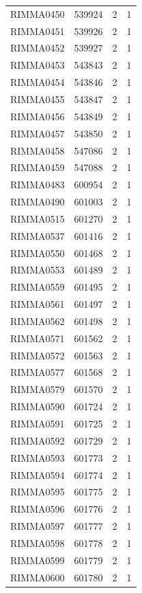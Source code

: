 \documentclass[11pt]{article}
\newcounter{rowno}
\begin{document}
\begin{scriptsize}
\begin{longtable}{>{\stepcounter{rowno}}cccc}
    RIMMA0450 & 539924 & 2     & 1 \\
    RIMMA0451 & 539926 & 2     & 1 \\
    RIMMA0452 & 539927 & 2     & 1 \\
    RIMMA0453 & 543843 & 2     & 1 \\
    RIMMA0454 & 543846 & 2     & 1 \\
    RIMMA0455 & 543847 & 2     & 1 \\
    RIMMA0456 & 543849 & 2     & 1 \\
    RIMMA0457 & 543850 & 2     & 1 \\
    RIMMA0458 & 547086 & 2     & 1 \\
    RIMMA0459 & 547088 & 2     & 1 \\
    RIMMA0483 & 600954 & 2     & 1 \\
    RIMMA0490 & 601003 & 2     & 1 \\
    RIMMA0515 & 601270 & 2     & 1 \\
    RIMMA0537 & 601416 & 2     & 1 \\
    RIMMA0550 & 601468 & 2     & 1 \\
    RIMMA0553 & 601489 & 2     & 1 \\
    RIMMA0559 & 601495 & 2     & 1 \\
    RIMMA0561 & 601497 & 2     & 1 \\
    RIMMA0562 & 601498 & 2     & 1 \\
    RIMMA0571 & 601562 & 2     & 1 \\
    RIMMA0572 & 601563 & 2     & 1 \\
    RIMMA0577 & 601568 & 2     & 1 \\
    RIMMA0579 & 601570 & 2     & 1 \\
    RIMMA0590 & 601724 & 2     & 1 \\
    RIMMA0591 & 601725 & 2     & 1 \\
    RIMMA0592 & 601729 & 2     & 1 \\
    RIMMA0593 & 601773 & 2     & 1 \\
    RIMMA0594 & 601774 & 2     & 1 \\
    RIMMA0595 & 601775 & 2     & 1 \\
    RIMMA0596 & 601776 & 2     & 1 \\
    RIMMA0597 & 601777 & 2     & 1 \\
    RIMMA0598 & 601778 & 2     & 1 \\
    RIMMA0599 & 601779 & 2     & 1 \\
    RIMMA0600 & 601780 & 2     & 1 \\

\end{longtable}
\end{scriptsize}
\end{document}
